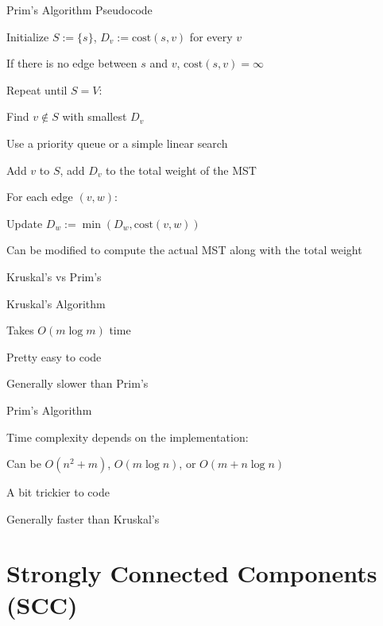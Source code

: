 \documentclass[13pt,onlymath]{beamer}
\begin{document}
\begin{frame}{Prim's Algorithm Pseudocode}
\BIT
\item Initialize $S := \{s\}$, $D_v := \mathrm{cost}(s, v)$ for every $v$
\BIT
\item If there is no edge between $s$ and $v$, $\mathrm{cost}(s, v) = \infty$
\EIT
\item Repeat until $S = V$:
\BIT
\item Find $v \notin S$ with smallest $D_v$
\BIT
\item Use a priority queue or a simple linear search
\EIT
\item Add $v$ to $S$, add $D_v$ to the total weight of the MST
\item For each edge $(v, w)$:
\BIT
\item Update $D_w := \min(D_w, \mathrm{cost}(v, w))$
\EIT
\EIT
\item Can be modified to compute the actual MST along with the total weight
\EIT
\end{frame}

\begin{frame}{Kruskal's vs Prim's}
\BIT
\item Kruskal's Algorithm
\BIT
\item Takes $O(m \log m)$ time
\item Pretty easy to code
\item Generally slower than Prim's
\EIT
\item Prim's Algorithm
\BIT
\item Time complexity depends on the implementation:
\BIT
\item Can be $O(n^2+m)$, $O(m \log n)$, or $O(m + n \log n)$
\EIT
\item A bit trickier to code
\item Generally faster than Kruskal's
\EIT
\EIT
\end{frame}


\section{Strongly Connected Components (SCC)}
\end{document}
